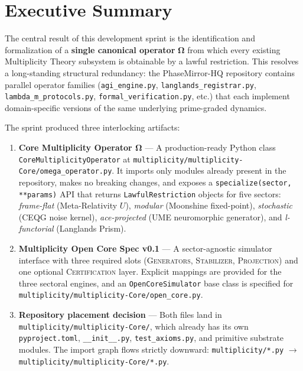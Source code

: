 \documentclass[12pt,a4paper]{article}
\theoremstyle{plain}
\theoremstyle{definition}
\theoremstyle{remark}
\begin{document}
\tableofcontents
\newpage

\section{Executive Summary}
\label{sec:exec}

The central result of this development sprint is the identification and
formalization of a \textbf{single canonical operator} $\boldsymbol{\Omega}$
from which every existing Multiplicity Theory subsystem is obtainable by
a lawful restriction. This resolves a long-standing structural redundancy:
the PhaseMirror-HQ repository contains parallel operator families
(\texttt{agi\_engine.py}, \texttt{langlands\_registrar.py},
\texttt{lambda\_m\_protocols.py}, \texttt{formal\_verification.py}, etc.)
that each implement domain-specific versions of the same underlying
prime-graded dynamics.

\medskip
The sprint produced three interlocking artifacts:

\begin{enumerate}[leftmargin=*]
  \item \textbf{Core Multiplicity Operator $\boldsymbol{\Omega}$} ---
        A production-ready Python class \texttt{CoreMultiplicityOperator}
        at \texttt{multiplicity/multiplicity-Core/omega\_operator.py}.
        It imports only modules already present in the repository,
        makes no breaking changes, and exposes a
        \texttt{specialize(sector, **params)} API that returns
        \texttt{LawfulRestriction} objects for five sectors:
        \textit{frame-flat} (Meta-Relativity $U$),
        \textit{modular} (Moonshine fixed-point),
        \textit{stochastic} (CEQG noise kernel),
        \textit{ace-projected} (UME neuromorphic generator), and
        \textit{l-functorial} (Langlands Prism).

  \item \textbf{Multiplicity Open Core Spec v0.1} ---
        A sector-agnostic simulator interface with three required slots
        (\textsc{Generators}, \textsc{Stabilizer}, \textsc{Projection})
        and one optional \textsc{Certification} layer.
        Explicit mappings are provided for the three sectoral engines,
        and an \texttt{OpenCoreSimulator} base class is specified for
        \texttt{multiplicity/multiplicity-Core/open\_core.py}.

  \item \textbf{Repository placement decision} ---
        Both files land in \texttt{multiplicity/multiplicity-Core/},
        which already has its own \texttt{pyproject.toml},
        \texttt{\_\_init\_\_.py}, \texttt{test\_axioms.py},
        and primitive substrate modules.
        The import graph flows strictly downward:
        \texttt{multiplicity/*.py} $\to$
        \texttt{multiplicity/multiplicity-Core/*.py}.
\end{enumerate}
\end{document}
